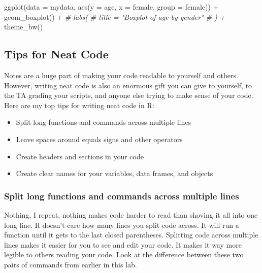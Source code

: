 \documentclass[
]{book}
\newenvironment{Shaded}{\begin{snugshade}}{\end{snugshade}}
\newcommand{\AttributeTok}[1]{\textcolor[rgb]{0.77,0.63,0.00}{#1}}
\newcommand{\CommentTok}[1]{\textcolor[rgb]{0.56,0.35,0.01}{\textit{#1}}}
\newcommand{\FunctionTok}[1]{\textcolor[rgb]{0.00,0.00,0.00}{#1}}
\newcommand{\NormalTok}[1]{#1}
\newcommand{\SpecialCharTok}[1]{\textcolor[rgb]{0.00,0.00,0.00}{#1}}
\providecommand{\tightlist}{%
  \setlength{\itemsep}{0pt}\setlength{\parskip}{0pt}}
\begin{document}
\begin{Shaded}
\begin{Highlighting}[]
\FunctionTok{ggplot}\NormalTok{(}\AttributeTok{data =}\NormalTok{ mydata, }\FunctionTok{aes}\NormalTok{(}\AttributeTok{y =}\NormalTok{ age, }\AttributeTok{x =}\NormalTok{ female, }\AttributeTok{group =}\NormalTok{ female)) }\SpecialCharTok{+} 
  \FunctionTok{geom\_boxplot}\NormalTok{() }\SpecialCharTok{+} 
  \CommentTok{\# labs(}
  \CommentTok{\#   title = "Boxplot of age by gender"}
  \CommentTok{\# ) + }
  \FunctionTok{theme\_bw}\NormalTok{() }
\end{Highlighting}
\end{Shaded}

\hypertarget{tips-for-neat-code-1}{%
\subsection*{Tips for Neat Code}\label{tips-for-neat-code-1}}

Notes are a huge part of making your code readable to yourself and others. However, writing neat code is also an enormous gift you can give to yourself, to the TA grading your scripts, and anyone else trying to make sense of your code. Here are my top tips for writing neat code in R:

\begin{itemize}
\tightlist
\item
  Split long functions and commands across multiple lines
\item
  Leave spaces around equals signs and other operators
\item
  Create headers and sections in your code
\item
  Create clear names for your variables, data frames, and objects
\end{itemize}

\hypertarget{split-long-functions-and-commands-across-multiple-lines-1}{%
\subsubsection*{Split long functions and commands across multiple lines}\label{split-long-functions-and-commands-across-multiple-lines-1}}

Nothing, I repeat, nothing makes code harder to read than shoving it all into one long line. R doesn't care how many lines you split code across. It will run a function until it gets to the last closed parentheses. Splitting code across multiple lines makes it easier for you to see and edit your code. It makes it way more legible to others reading your code. Look at the difference between these two pairs of commands from earlier in this lab.
\end{document}
